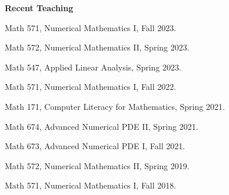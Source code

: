 \documentclass[11pt]{letter}
\begin{document}
	{\LARGE\bf  Recent Teaching}
    \begin{description}
    \item
Math 571, Numerical Mathematics I, Fall 2023.
    \item
Math 572, Numerical Mathematics II, Spring 2023.
	\item
Math 547, Applied Linear Analysis, Spring 2023.
    
    \item
Math 571, Numerical Mathematics I, Fall 2022.
    \item
Math 171, Computer Literacy for Mathematics, Spring 2021.
    \item
Math 674, Advanced Numerical PDE II, Spring 2021.
    \item
Math 673, Advanced Numerical PDE I, Fall 2021.
    \item
Math 572, Numerical Mathematics II, Spring 2019.
    \item
Math 571, Numerical Mathematics I, Fall 2018.
	\end{description}
\end{document}

